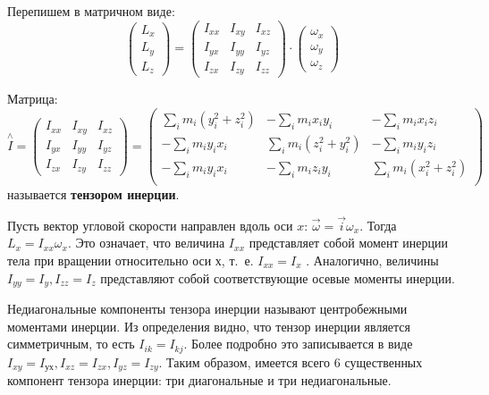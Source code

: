 \documentclass[12pt, a4paper]{article}
\begin{document}
	Перепишем в матричном виде:	
\begin{equation*}
\begin{pmatrix}
L_x \\
L_y \\
L_z 
\end{pmatrix} 	
	=
	\begin{pmatrix}
	I_{xx} & I_{xy} & I_{xz} \\
	I_{yx} & I_{yy} & I_{yz} \\
	I_{zx} & I_{zy} & I_{zz}
	\end{pmatrix} 	
	\cdot	 
	\begin{pmatrix}
	\omega_x \\
	\omega_y \\
	\omega_z 
	\end{pmatrix}
\end{equation*}

Матрица:
\begin{equation*}
\stackrel{\land}{I}
	=
	\begin{pmatrix}
	I_{xx} & I_{xy} & I_{xz} \\
	I_{yx} & I_{yy} & I_{yz} \\
	I_{zx} & I_{zy} & I_{zz}
	\end{pmatrix} 	
		=
		\begin{pmatrix}
		\sum_i m_i (y_i^2+z_i^2) & -\sum_i m_i x_i y_i & 			-\sum_i m_i x_i z_i \\
		-\sum_i m_i y_i x_i & \sum_i m_i (z_i^2+y_i^2) & 
		-\sum_i m_i y_i z_i \\
		-\sum_i m_i y_i x_i & -\sum_i m_i z_i y_i & 
		\sum_i m_i (x_i^2+z_i^2) \\
		\end{pmatrix}
\end{equation*}
называется \textbf{тензором инерции}.

Пусть вектор угловой скорости направлен вдоль оси $x$: $\vec{\omega} = \vec{i} \omega_x$. Тогда $L_x = I_{xx}\omega_x$. Это означает, что величина $I_{xx}$ представляет собой момент инерции тела
при вращении относительно оси $х$, т.~е. $I_{xx} = I_x$ . Аналогично, величины
$I_{yy}= I_y,  I_{zz} = I_z$ представляют собой соответствующие осевые моменты
инерции.

Недиагональные компоненты тензора инерции называют центробежными моментами инерции.
Из определения видно, что тензор инерции является симметричным,
то есть $I_{ik} = I_{kj}$. Более подробно это записывается в виде
$I_{xy} = I_{ух},  I_{xz} = I_{zx}, I_{yz} = I_{zy}$.
Таким образом, имеется всего $6$ существенных компонент тензора инерции: три диагональные и три недиагональные.
\end{document}
